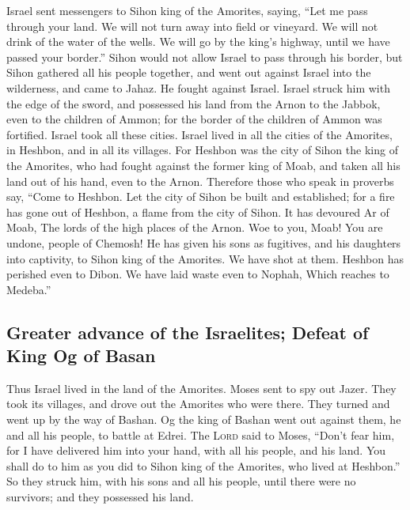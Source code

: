  Israel sent messengers to Sihon king of the Amorites,
saying,  ``Let me pass through your land. We will not
turn away into field or vineyard. We will not drink of the water of the
wells. We will go by the king's highway, until we have passed your
border.''  Sihon would not allow Israel to pass through
his border, but Sihon gathered all his people together, and went out
against Israel into the wilderness, and came to Jahaz. He fought against
Israel.  Israel struck him with the edge of the sword,
and possessed his land from the Arnon to the Jabbok, even to the
children of Ammon; for the border of the children of Ammon was
fortified.  Israel took all these cities. Israel lived in
all the cities of the Amorites, in Heshbon, and in all its villages.
 For Heshbon was the city of Sihon the king of the
Amorites, who had fought against the former king of Moab, and taken all
his land out of his hand, even to the Arnon.  Therefore
those who speak in proverbs say, ``Come to Heshbon. Let the city of
Sihon be built and established;  for a fire has gone out
of Heshbon, a flame from the city of Sihon. It has devoured Ar of Moab,
The lords of the high places of the Arnon.  Woe to you,
Moab! You are undone, people of Chemosh! He has given his sons as
fugitives, and his daughters into captivity, to Sihon king of the
Amorites.  We have shot at them. Heshbon has perished
even to Dibon. We have laid waste even to Nophah, Which reaches to
Medeba.''

\hypertarget{greater-advance-of-the-israelites-defeat-of-king-og-of-basan}{%
\subsection{Greater advance of the Israelites; Defeat of King Og of
Basan}\label{greater-advance-of-the-israelites-defeat-of-king-og-of-basan}}

 Thus Israel lived in the land of the Amorites.
 Moses sent to spy out Jazer. They took its villages, and
drove out the Amorites who were there.  They turned and
went up by the way of Bashan. Og the king of Bashan went out against
them, he and all his people, to battle at Edrei.  The
\textsc{Lord} said to Moses, ``Don't fear him, for I have delivered him
into your hand, with all his people, and his land. You shall do to him
as you did to Sihon king of the Amorites, who lived at Heshbon.''
 So they struck him, with his sons and all his people,
until there were no survivors; and they possessed his land.

